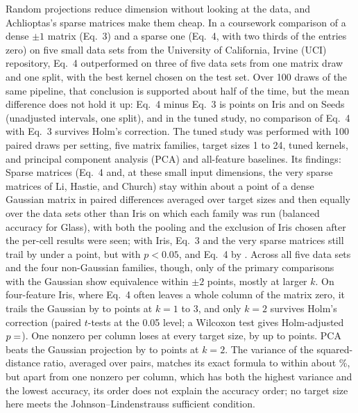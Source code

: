 Random projections reduce dimension without looking at the data, and Achlioptas's sparse matrices make them cheap. In a coursework comparison of a dense $\pm 1$ matrix (Eq.~3) and a sparse one (Eq.~4, with two thirds of the entries zero) on five small data sets from the University of California, Irvine (UCI) repository, Eq.~4 outperformed on three of five data sets from one matrix draw and one split, with the best kernel chosen on the test set. Over 100 draws of the same pipeline, that conclusion is supported about half of the time, but the mean difference does not hold it up: Eq.~4 minus Eq.~3 is  points on Iris and  on Seeds (unadjusted intervals, one split), and in the tuned study, no comparison of Eq.~4 with Eq.~3 survives Holm's correction. The tuned study was performed with 100 paired draws per setting, five matrix families, target sizes 1 to 24, tuned kernels, and principal component analysis (PCA) and all-feature baselines. Its findings: Sparse matrices (Eq.~4 and, at these small input dimensions, the very sparse matrices of Li, Hastie, and Church) stay within about a point of a dense Gaussian matrix in paired differences averaged over target sizes and then equally over the data sets other than Iris on which each family was run (balanced accuracy for Glass), with both the pooling and the exclusion of Iris chosen after the per-cell results were seen; with Iris, Eq.~3 and the very sparse matrices still trail by under a point, but with $p < 0.05$, and Eq.~4 by . Across all five data sets and the four non-Gaussian families, though, only  of the  primary comparisons with the Gaussian show equivalence within $\pm 2$ points, mostly at larger $k$. On four-feature Iris, where Eq.~4 often leaves a whole column of the matrix zero, it trails the Gaussian by  to  points at $k = 1$ to 3, and only $k = 2$ survives Holm's correction (paired $t$-tests at the 0.05 level; a Wilcoxon test gives Holm-adjusted $p = \N{wxh:iris:2:eq4:gauss}$). One nonzero per column loses at every target size, by up to  points. PCA beats the Gaussian projection by  to  points at $k = 2$. The variance of the squared-distance ratio, averaged over pairs, matches its exact formula to within about \%, but apart from one nonzero per column, which has both the highest variance and the lowest accuracy, its order does not explain the accuracy order; no target size here meets the Johnson--Lindenstrauss sufficient condition.
